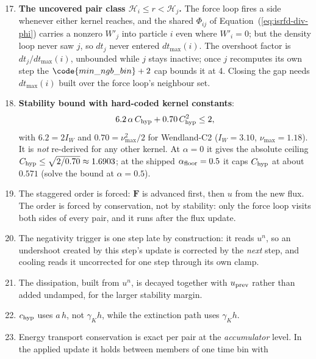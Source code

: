 \begin{enumerate}
  \setcounter{enumi}{16}
  \item \label{it:isrfd-uncovered} \textbf{The uncovered pair class
    $\mathcal{H}_i \le r < \mathcal{H}_j$.}
    The force loop fires a side whenever either kernel reaches, and the shared
    $\Phi_{ij}$ of Equation~(\ref{eq:isrfd-div-phi}) carries a nonzero
    $W'_j$ into particle $i$ even where $W'_i = 0$; but the
    density loop never saw $j$, so $dt_j$ never entered $dt_{\max}(i)$. The
    overshoot factor is $dt_j/dt_{\max}(i)$, unbounded while $j$ stays
    inactive; once $j$ recomputes its own step the
    $\code{min\_ngb\_bin} + 2$ cap bounds it at 4. Closing the gap needs
    $dt_{\max}(i)$ built over the force loop's neighbour set.
  \item \textbf{Stability bound with hard-coded kernel constants}:
    \begin{equation}
      6.2\,\alpha\, C_{\rm hyp} + 0.70\, C_{\rm hyp}^2 \le 2,
      \label{eq:isrfd-stability}
    \end{equation}
    with $6.2 = 2 I_W$ and $0.70 = \nu_{\max}^2/2$ for Wendland-C2
    ($I_W = 3.10$, $\nu_{\max} = 1.18$). It is \emph{not} re-derived for any
    other kernel. At $\alpha = 0$ it gives the absolute ceiling
    $C_{\rm hyp} \le \sqrt{2/0.70} \approx 1.6903$; at the shipped
    $\alpha_{\rm floor} = 0.5$ it caps $C_{\rm hyp}$ at about $0.571$
    (solve the bound at $\alpha = 0.5$).
  \item The staggered order is forced: $\boldsymbol{F}$ is advanced first, then
    $u$ from the new flux. The order is forced by conservation, not by
    stability: only the force loop visits both sides of every pair, and it runs
    after the flux update.
  \item The negativity trigger is one step late by construction: it reads
    $u^n$, so an undershoot created by this step's update is corrected by the
    \emph{next} step, and cooling reads it uncorrected for one step through its
    own clamp.
  \item The dissipation, built from $u^n$, is decayed together with
    $u_{\rm prev}$ rather than added undamped, for the larger stability margin.
  \item $c_{\rm hyp}$ uses $a\, h$, not $\gamma_K h$, while the
    extinction path uses $\gamma_K h$.
  \item Energy transport conservation is exact per pair at the \emph{accumulator}
    level. In the applied update it holds between members of one time bin with

\end{enumerate}
